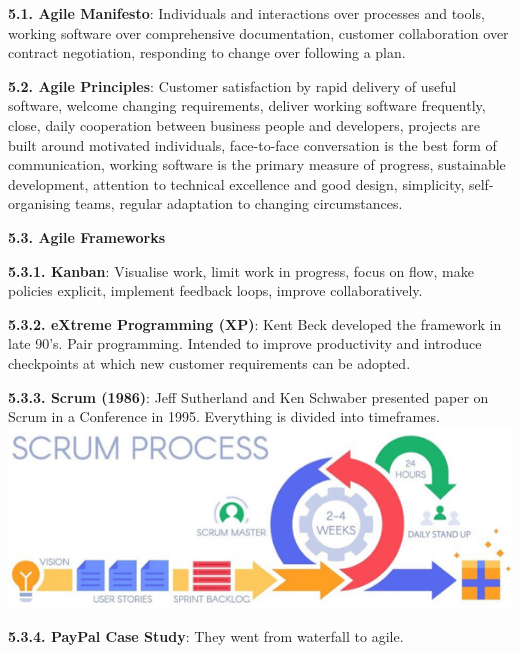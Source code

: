     \textbf{5.1. Agile Manifesto}: Individuals and interactions over processes and tools, working software over comprehensive documentation, customer collaboration over contract negotiation, responding to change over following a plan.

    \textbf{5.2. Agile Principles}: Customer satisfaction by rapid delivery of useful software, welcome changing requirements, deliver working software frequently, close, daily cooperation between business people and developers, projects are built around motivated individuals, face-to-face conversation is the best form of communication, working software is the primary measure of progress, sustainable development, attention to technical excellence and good design, simplicity, self-organising teams, regular adaptation to changing circumstances.

    \textbf{5.3. Agile Frameworks}

        \textbf{5.3.1. Kanban}: Visualise work, limit work in progress, focus on flow, make policies explicit, implement feedback loops, improve collaboratively.

        \textbf{5.3.2. eXtreme Programming (XP)}: Kent Beck developed the framework in late 90's. Pair programming. Intended to improve productivity and introduce checkpoints at which new customer requirements can be adopted.

        \textbf{5.3.3. Scrum (1986)}: Jeff Sutherland and Ken Schwaber presented paper on Scrum in a Conference in 1995. Everything is divided into timeframes.
        \includegraphics[width=\linewidth]{figs/SCR-20240605-payc.png}

        \textbf{5.3.4. PayPal Case Study}: They went from waterfall to agile.
